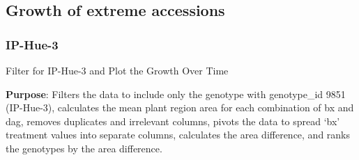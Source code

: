 \documentclass[
  11pt,
]{article}
\begin{document}
\subsection{Growth of extreme
accessions}\label{growth-of-extreme-accessions}

\subsubsection{IP-Hue-3}\label{ip-hue-3}

Filter for IP-Hue-3 and Plot the Growth Over Time

\textbf{Purpose}: Filters the data to include only the genotype with
genotype\_id 9851 (IP-Hue-3), calculates the mean plant region area for
each combination of bx and dag, removes duplicates and irrelevant
columns, pivots the data to spread `bx' treatment values into separate
columns, calculates the area difference, and ranks the genotypes by the
area difference.
\end{document}
